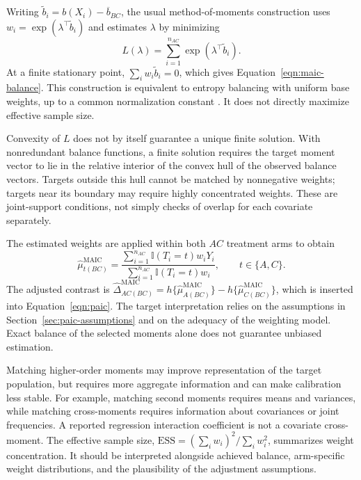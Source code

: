\documentclass[article]{jss}
\begin{document}
Writing $\widetilde b_i=b(X_i)-\overline b_{BC}$, the usual method-of-moments construction uses $w_i=\exp(\lambda^\top\widetilde b_i)$ and estimates $\lambda$ by minimizing
\begin{equation}
\label{eqn:maic-objective}
L(\lambda)=\sum_{i=1}^{n_{AC}}\exp(\lambda^\top\widetilde b_i).
\end{equation}
At a finite stationary point, $\sum_i w_i\widetilde b_i=0$, which gives Equation~\ref{eqn:maic-balance}. This construction is equivalent to entropy balancing with uniform base weights, up to a common normalization constant \citep{phillippo2020entropy}. It does not directly maximize effective sample size.

Convexity of $L$ does not by itself guarantee a unique finite solution. With nonredundant balance functions, a finite solution requires the target moment vector to lie in the relative interior of the convex hull of the observed balance vectors. Targets outside this hull cannot be matched by nonnegative weights; targets near its boundary may require highly concentrated weights. These are joint-support conditions, not simply checks of overlap for each covariate separately.

The estimated weights are applied within both $AC$ treatment arms to obtain
\begin{equation}
\label{eqn:maic-means}
\widehat\mu^{\mathrm{MAIC}}_{t(BC)}=
\frac{\sum_{i=1}^{n_{AC}}\mathbb{I}(T_i=t)w_iY_i}
     {\sum_{i=1}^{n_{AC}}\mathbb{I}(T_i=t)w_i},
\qquad t\in\{A,C\}.
\end{equation}
The adjusted contrast is $\widehat\Delta^{\mathrm{MAIC}}_{AC(BC)}=h\{\widehat\mu^{\mathrm{MAIC}}_{A(BC)}\}-h\{\widehat\mu^{\mathrm{MAIC}}_{C(BC)}\}$, which is inserted into Equation~\ref{eqn:paic}. The target interpretation relies on the assumptions in Section~\ref{sec:paic-assumptions} and on the adequacy of the weighting model. Exact balance of the selected moments alone does not guarantee unbiased estimation.

Matching higher-order moments may improve representation of the target population, but requires more aggregate information and can make calibration less stable. For example, matching second moments requires means and variances, while matching cross-moments requires information about covariances or joint frequencies. A reported regression interaction coefficient is not a covariate cross-moment. The effective sample size, $\mathrm{ESS}=(\sum_iw_i)^2/\sum_iw_i^2$, summarizes weight concentration. It should be interpreted alongside achieved balance, arm-specific weight distributions, and the plausibility of the adjustment assumptions.
\end{document}
